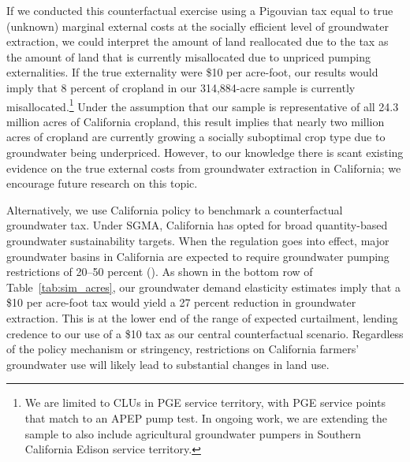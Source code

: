 If we conducted this counterfactual exercise using a Pigouvian tax equal to true (unknown) marginal external costs at the socially efficient level of groundwater extraction, we could interpret the amount of land reallocated due to the tax as the amount of land that is currently misallocated due to unpriced pumping externalities.
If the true externality were \$10 per acre-foot, our results would imply that 8 percent of cropland in our 314,884-acre sample is currently misallocated.\footnote{We are limited to CLUs in PGE service territory, with PGE service points that match to an APEP pump test. In ongoing work, we are extending the sample to also include agricultural groundwater pumpers in Southern California Edison service territory.} Under the assumption that our sample is representative of all 24.3 million acres of California cropland,
this result implies that nearly two million acres of cropland are currently growing a socially suboptimal crop type due to groundwater being underpriced. However, to our knowledge there is scant existing evidence on the true external costs from groundwater extraction in California; we encourage future research on this topic. 

Alternatively, we use California policy to benchmark a counterfactual groundwater tax. Under SGMA, California has opted for broad quantity-based groundwater sustainability targets. When the regulation goes into effect, major groundwater basins in California are expected to require groundwater pumping restrictions of 20--50 percent (\textcite{bruno2019}). As shown in the bottom row of Table~\ref{tab:sim_acres}, our groundwater demand elasticity estimates imply that a \$10 per acre-foot tax would yield a 27 percent reduction in groundwater extraction. This is at the lower end of the range of expected curtailment, lending credence to our use of a \$10 tax as our central counterfactual scenario. Regardless of the policy mechanism or stringency, restrictions on California farmers' groundwater use will likely lead to substantial changes in land use.




